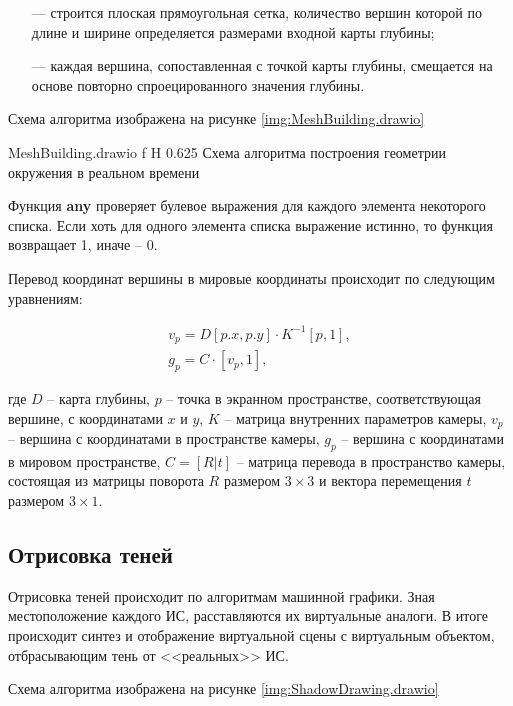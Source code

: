 \begin{itemize}
	\item[---] строится плоская прямоугольная сетка, количество вершин которой по длине и ширине определяется размерами входной карты глубины;
	\item[---] каждая вершина, сопоставленная с точкой карты глубины, смещается на основе повторно спроецированного значения глубины.
\end{itemize}

Схема алгоритма изображена на рисунке \ref{img:MeshBuilding.drawio}

{MeshBuilding.drawio}
{f}
{H}
{0.625\textwidth}
{Схема алгоритма построения геометрии окружения в реальном времени}

Функция \textbf{any} проверяет булевое выражения для каждого элемента некоторого списка. Если хоть для одного элемента списка выражение истинно, то функция возвращает 1, иначе -- 0.

Перевод координат вершины в мировые координаты происходит по следующим уравнениям:

\begin{equation}
	\begin{split}
		v_p = D[p.x, p.y] \cdot K^{-1} [p, 1], \\
		g_p = C \cdot [v_p, 1],
	\end{split}
\end{equation}

где $D$ -- карта глубины, $p$ -- точка в экранном пространстве, соответствующая вершине, с координатами $x$ и $y$, $K$ -- матрица внутренних параметров камеры, $v_p$ -- вершина с координатами в пространстве камеры, $g_p$ -- вершина с координатами в мировом пространстве, $C = [R|t]$ -- матрица перевода в пространство камеры, состоящая из матрицы поворота $R$ размером $3 \times 3$ и вектора перемещения $t$ размером $3 \times 1$.

\subsection{Отрисовка теней}

Отрисовка теней происходит по алгоритмам машинной графики. Зная местоположение каждого ИС, расставляются их виртуальные аналоги. В итоге происходит синтез и отображение виртуальной сцены с виртуальным объектом, отбрасывающим тень от <<реальных>> ИС.

Схема алгоритма изображена на рисунке \ref{img:ShadowDrawing.drawio}

